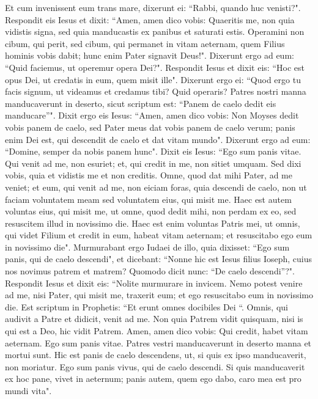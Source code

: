 \begin{biblechapter}
\verse Et cum invenissent eum trans mare, dixerunt ei: “Rabbi, quando huc venisti?". 
\verse Respondit eis Iesus et dixit: “Amen, amen dico vobis: Quaeritis me, non quia vidistis signa, sed quia manducastis ex panibus et saturati estis. 
\verse Operamini non cibum, qui perit, sed cibum, qui permanet in vitam aeternam, quem Filius hominis vobis dabit; hunc enim Pater signavit Deus!". 
\verse Dixerunt ergo ad eum: “Quid faciemus, ut operemur opera Dei?". 
\verse Respondit Iesus et dixit eis: “Hoc est opus Dei, ut credatis in eum, quem misit ille". 
\verse Dixerunt ergo ei: “Quod ergo tu facis signum, ut videamus et credamus tibi? Quid operaris? 
\verse Patres nostri manna manducaverunt in deserto, sicut scriptum est: “Panem de caelo dedit eis manducare”". 
\verse Dixit ergo eis Iesus: “Amen, amen dico vobis: Non Moyses dedit vobis panem de caelo, sed Pater meus dat vobis panem de caelo verum; 
\verse panis enim Dei est, qui descendit de caelo et dat vitam mundo". 
\verse Dixerunt ergo ad eum: “Domine, semper da nobis panem hunc". 
\verse Dixit eis Iesus: “Ego sum panis vitae. Qui venit ad me, non esuriet; et, qui credit in me, non sitiet umquam. 
\verse Sed dixi vobis, quia et vidistis me et non creditis. 
\verse Omne, quod dat mihi Pater, ad me veniet; et eum, qui venit ad me, non eiciam foras, 
\verse quia descendi de caelo, non ut faciam voluntatem meam sed voluntatem eius, qui misit me. 
\verse Haec est autem voluntas eius, qui misit me, ut omne, quod dedit mihi, non perdam ex eo, sed resuscitem illud in novissimo die. 
\verse Haec est enim voluntas Patris mei, ut omnis, qui videt Filium et credit in eum, habeat vitam aeternam; et resuscitabo ego eum in novissimo die". 
\verse Murmurabant ergo Iudaei de illo, quia dixisset: “Ego sum panis, qui de caelo descendi", 
\verse et dicebant: “Nonne hic est Iesus filius Ioseph, cuius nos novimus patrem et matrem? Quomodo dicit nunc: “De caelo descendi”?". 
\verse Respondit Iesus et dixit eis: “Nolite murmurare in invicem. 
\verse Nemo potest venire ad me, nisi Pater, qui misit me, traxerit eum; et ego resuscitabo eum in novissimo die. 
\verse Est scriptum in Prophetis: “Et erunt omnes docibiles Dei “. Omnis, qui audivit a Patre et didicit, venit ad me. 
\verse Non quia Patrem vidit quisquam, nisi is qui est a Deo, hic vidit Patrem. 
\verse Amen, amen dico vobis: Qui credit, habet vitam aeternam. 
\verse Ego sum panis vitae. 
\verse Patres vestri manducaverunt in deserto manna et mortui sunt. 
\verse Hic est panis de caelo descendens, ut, si quis ex ipso manducaverit, non moriatur. 
\verse Ego sum panis vivus, qui de caelo descendi. Si quis manducaverit ex hoc pane, vivet in aeternum; panis autem, quem ego dabo, caro mea est pro mundi vita". 

\end{biblechapter}
